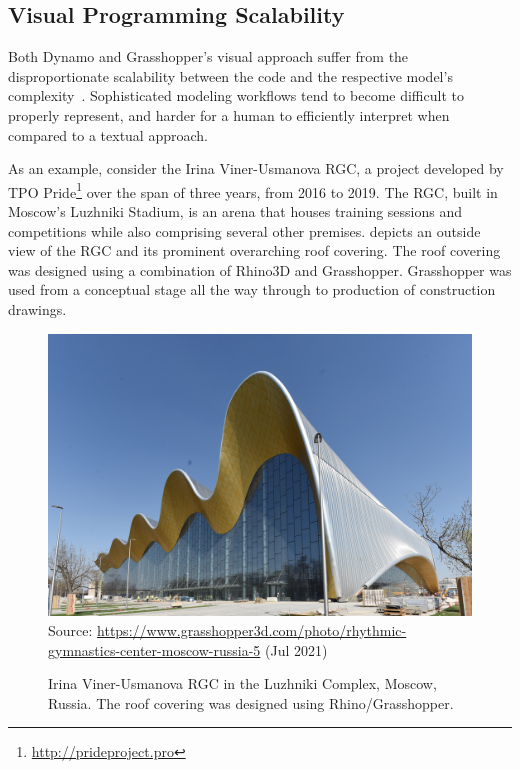 \subsection{Visual Programming Scalability}%
\label{sec:related.ad.vpl-scalability}

Both Dynamo and Grasshopper's visual approach suffer from the disproportionate
scalability between the code and the respective model's
complexity~\cite{Leitao:2013:PESLGD}.  Sophisticated modeling workflows tend to
become difficult to properly represent, and harder for a human to efficiently
interpret when compared to a textual approach.

As an example, consider the Irina Viner-Usmanova \ac{RGC}, a project developed
by TPO Pride\footnote{\url{http://prideproject.pro}} over the span of three
years, from 2016 to 2019.  The \ac{RGC}, built in Moscow's Luzhniki Stadium, is
an arena that houses training sessions and competitions while also comprising
several other premises.   depicts an
outside view of the \ac{RGC} and its prominent overarching roof covering.  The
roof covering was designed using a combination of Rhino3D and Grasshopper.
Grasshopper was used from a conceptual stage all the way through to production
of construction drawings.

\begin{figure}[htbp]
  \includegraphics[width=\textwidth]{fig/rgc}\\
  {\scriptsize
  Source: \url{https://www.grasshopper3d.com/photo/rhythmic-gymnastics-center-moscow-russia-5}
  (Jul 2021)
  }
  \caption[\acl{RGC} in the Luzhniki Complex]{
    Irina Viner-Usmanova \ac{RGC} in the Luzhniki Complex, Moscow, Russia.  The
    roof covering was designed using Rhino/Grasshopper.}
  \label{fig:related.ad.vpl-scalability.rgc}
\end{figure}

